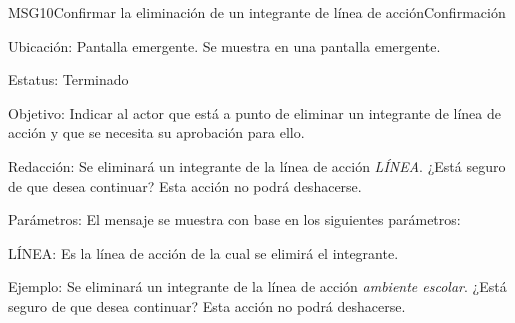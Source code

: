 \begin{mensaje}{MSG10}{Confirmar la eliminación de un integrante de línea de acción}{Confirmación}
    \item[Ubicación:] Pantalla emergente. Se muestra en una pantalla emergente.
    \item[Estatus:] Terminado
    \item[Objetivo:] Indicar al actor que está a punto de eliminar un integrante de línea de acción y que se necesita su aprobación para ello.
    \item[Redacción:] Se eliminará un integrante de la línea de acción \textit{LÍNEA}. ¿Está seguro de que desea continuar? Esta acción no podrá deshacerse.
    \item[Parámetros:] El mensaje se muestra con base en los siguientes parámetros:
    \begin{Citemize}
	\item LÍNEA: Es la línea de acción de la cual se elimirá el integrante.
    \end{Citemize}
    \item[Ejemplo:] Se eliminará un integrante de la línea de acción {\em ambiente escolar}. ¿Está seguro de que desea continuar? Esta acción no podrá deshacerse.
\end{mensaje}

